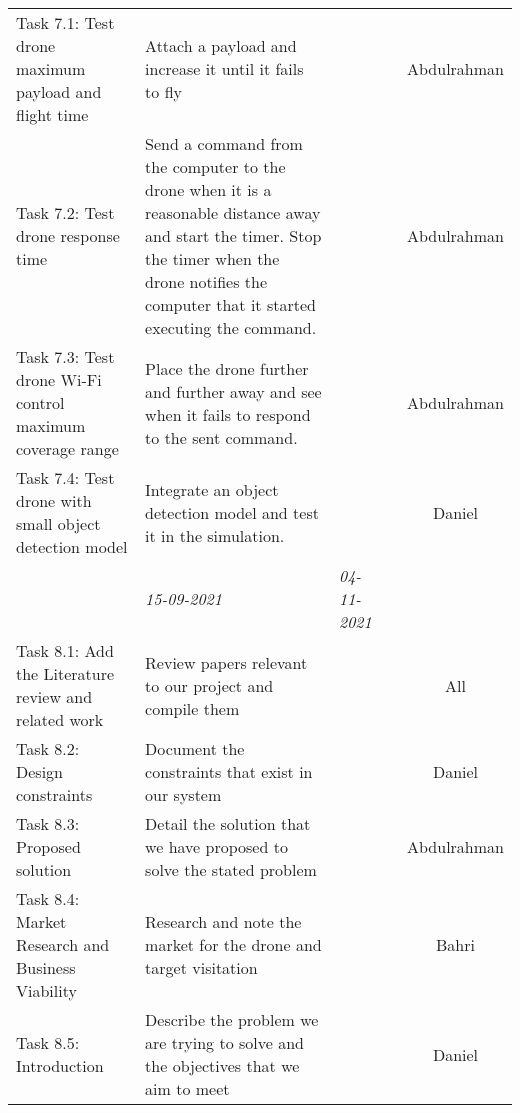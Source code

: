 \begin{center}
\begin{small}
\begin{xltabular}{\textwidth}{ p{3cm} p{5cm} X X c }
            Task 7.1: Test drone maximum payload and flight 
            time 
                & Attach a payload and increase it
                until it fails to fly & & & Abdulrahman \\

            Task 7.2: Test drone response time
                & Send a command from the computer
                to the drone when it is a reasonable 
                distance away and start the timer.
                Stop the timer when the drone notifies the
                computer that it started executing the 
                command. & & & Abdulrahman \\

            Task 7.3: Test drone Wi-Fi control maximum 
            coverage range
                & Place the drone further and further away
                and see when it fails to respond to the
                sent command. & & & Abdulrahman \\

            Task 7.4: Test drone with small object detection 
            model 
                & Integrate an object detection model
                and test it in the simulation. & & & Daniel \\

            \addlinespace
                & \emph{15-09-2021} & \emph{04-11-2021} & 
            \\ \addlinespace

            Task 8.1: Add the Literature review and related work
                & Review papers relevant to our project
                and compile them & & & All \\

            Task 8.2: Design constraints 
                & Document the constraints that exist in our
                system & & & Daniel \\

            Task 8.3: Proposed solution 
                & Detail the solution that we have proposed
                to solve the stated problem & & 
                & Abdulrahman \\

            Task 8.4: Market Research and Business Viability
                & Research and note the market for the
                drone and target visitation & & & Bahri \\

            Task 8.5: Introduction 
                & Describe the problem we are trying to solve
                and the objectives that we aim to meet
                & & & Daniel \\


\end{xltabular}
\end{small}
\end{center}
